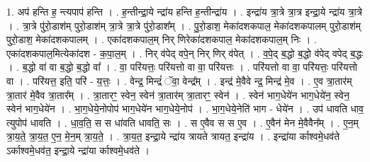 \documentclass[17pt]{extarticle}
\begin{document}
1. अप॑ हन्ति ह॒ न्त्यपाप॑ हन्ति । . ह॒न्तीन्द्रा॒ये न्द्रा॑य हन्ति ह॒न्तीन्द्रा॑य । . इन्द्रा॑य त्रा॒त्रे त्रा॒त्र इन्द्रा॒ये न्द्रा॑य त्रा॒त्रे । . त्रा॒त्रे पु॑रो॒डाश॑म् पुरो॒डाश॑म् त्रा॒त्रे त्रा॒त्रे पु॑रो॒डाश᳚म् । . पु॒रो॒डाश॒ मेका॑दशकपाल॒ मेका॑दशकपालम् पुरो॒डाश॑म् पुरो॒डाश॒ मेका॑दशकपालम् । . एका॑दशकपाल॒म् निर् णिरेका॑दशकपाल॒ मेका॑दशकपाल॒म् निः । . एका॑दशकपाल॒मित्येका॑दश - क॒पा॒ल॒म् । . निर् व॑पेद् वपे॒न् निर् णिर् व॑पेत् । . व॒पे॒द् ब॒द्धो ब॒द्धो व॑पेद् वपेद् ब॒द्धः । . ब॒द्धो वा॑ वा ब॒द्धो ब॒द्धो वा᳚ । . वा॒ परि॑यत्तः॒ परि॑यत्तो वा वा॒ परि॑यत्तः । . परि॑यत्तो वा वा॒ परि॑यत्तः॒ परि॑यत्तो वा । . परि॑यत्त॒ इति॒ परि॑ - य॒त्तः॒ । . वेन्द्र॒ मिन्द्रं॑ ॅवा॒ वेन्द्र᳚म् । . इन्द्र॑ मे॒वैवे न्द्र॒ मिन्द्र॑ मे॒व । . ए॒व त्रा॒तार॑म् त्रा॒तार॑ मे॒वैव त्रा॒तार᳚म् । . त्रा॒तारꣳ॒॒ स्वेन॒ स्वेन॑ त्रा॒तार॑म् त्रा॒तारꣳ॒॒ स्वेन॑ । . स्वेन॑ भाग॒धेये॑न भाग॒धेये॑न॒ स्वेन॒ स्वेन॑ भाग॒धेये॑न । . भा॒ग॒धेये॒नोपोप॑ भाग॒धेये॑न भाग॒धेये॒नोप॑ । . भा॒ग॒धेये॒नेति॑ भाग - धेये॑न । . उप॑ धावति धाव॒ त्युपोप॑ धावति । . धा॒व॒ति॒ स स धा॑वति धावति॒ सः । . स ए॒वैव स स ए॒व । . ए॒वैन॑ मेन मे॒वैवैन᳚म् । . ए॒न॒म् त्रा॒य॒ते॒ त्रा॒य॒त॒ ए॒न॒ मे॒न॒म् त्रा॒य॒ते॒ । . त्रा॒य॒त॒ इन्द्रा॒ये न्द्रा॑य त्रायते त्रायत॒ इन्द्रा॑य । . इन्द्रा॑या र्काश्वमे॒धव॑ते ऽर्काश्वमे॒धव॑त॒ इन्द्रा॒ये न्द्रा॑या र्काश्वमे॒धव॑ते । \newline
\end{document}
